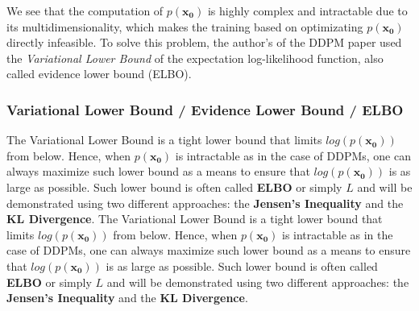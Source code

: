 \documentclass{article}
\begin{document}
We see that the computation of $p(\mathbf{x_0})$ is highly complex and intractable due to its multidimensionality, which makes the training based on optimizating $p(\mathbf{x_{0}})$ directly infeasible. To solve this problem, the author's of the DDPM paper used the \textit{Variational Lower Bound} of the expectation log-likelihood function, also called evidence lower bound (ELBO).

\subsubsection{Variational Lower Bound / Evidence Lower Bound / ELBO}

 The Variational Lower Bound is a tight lower bound that limits $log(p(\mathbf{x_0}))$ from below. Hence, when $p(\mathbf{x_0})$ is intractable as in the case of DDPMs, one can always maximize such lower bound as a means to ensure that $log(p(\mathbf{x_0}))$ is as large as possible. Such lower bound is often called \textbf{ELBO} or simply \textbf{$L$} and will be demonstrated using two different approaches: the \textbf{Jensen's Inequality} and the \textbf{KL Divergence}.
 The Variational Lower Bound is a tight lower bound that limits $log(p(\mathbf{x_0}))$ from below. Hence, when $p(\mathbf{x_0})$ is intractable as in the case of DDPMs, one can always maximize such lower bound as a means to ensure that $log(p(\mathbf{x_0}))$ is as large as possible. Such lower bound is often called \textbf{ELBO} or simply \textbf{$L$} and will be demonstrated using two different approaches: the \textbf{Jensen's Inequality} and the \textbf{KL Divergence}.
 
\end{document}
